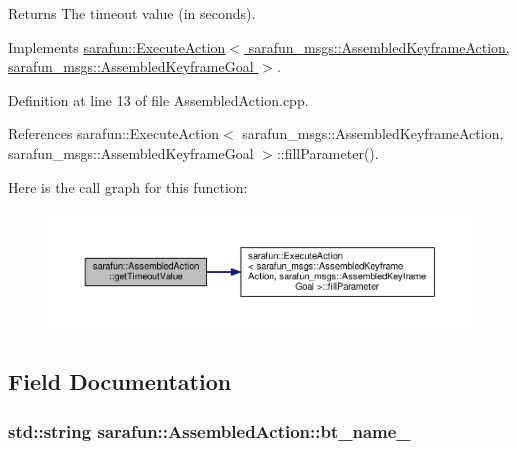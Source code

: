 \begin{DoxyReturn}{Returns}
The timeout value (in seconds). 
\end{DoxyReturn}


Implements \hyperlink{classsarafun_1_1ExecuteAction_aba6cfa8a8ce19e735eb6394424df6d17_aba6cfa8a8ce19e735eb6394424df6d17}{sarafun\-::\-Execute\-Action$<$ sarafun\-\_\-msgs\-::\-Assembled\-Keyframe\-Action, sarafun\-\_\-msgs\-::\-Assembled\-Keyframe\-Goal $>$}.



Definition at line 13 of file Assembled\-Action.\-cpp.



References sarafun\-::\-Execute\-Action$<$ sarafun\-\_\-msgs\-::\-Assembled\-Keyframe\-Action, sarafun\-\_\-msgs\-::\-Assembled\-Keyframe\-Goal $>$\-::fill\-Parameter().



Here is the call graph for this function\-:
\nopagebreak
\begin{figure}[H]
\begin{center}
\leavevmode
\includegraphics[width=350pt]{dc/d58/classsarafun_1_1AssembledAction_ade9095a291dce652339238d137419b49_ade9095a291dce652339238d137419b49_cgraph}
\end{center}
\end{figure}




\subsection{Field Documentation}
\hypertarget{classsarafun_1_1AssembledAction_a4dae92c3c98d924c35f9cda69ede136d_a4dae92c3c98d924c35f9cda69ede136d}{
\subsubsection[{bt\-\_\-name\-\_\-}]{\setlength{\rightskip}{0pt plus 5cm}std\-::string sarafun\-::\-Assembled\-Action\-::bt\-\_\-name\-\_\-\hspace{0.3cm}{\ttfamily [private]}}}\label{classsarafun_1_1AssembledAction_a4dae92c3c98d924c35f9cda69ede136d_a4dae92c3c98d924c35f9cda69ede136d}



